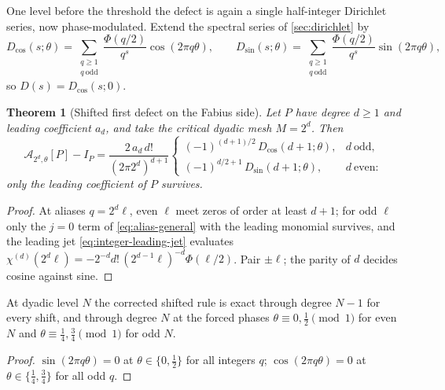 \documentclass[11pt,oneside]{article}
\numberwithin{equation}{section}
\newtheorem{theorem}{Theorem}[section]
\theoremstyle{definition}
\theoremstyle{remark}
\begin{document}
One level before the threshold the defect is again a single
half-integer Dirichlet series, now phase-modulated.  Extend the
spectral series of \cref{sec:dirichlet} by
\begin{equation}
 D_{\cos}(s;\theta)
 =\sum_{\substack{q\ge1\\q\ \mathrm{odd}}}
 \frac{\Phi(q/2)}{q^{s}}\cos(2\pi q\theta),
 \qquad
 D_{\sin}(s;\theta)
 =\sum_{\substack{q\ge1\\q\ \mathrm{odd}}}
 \frac{\Phi(q/2)}{q^{s}}\sin(2\pi q\theta),
 \label{eq:D-phase}
\end{equation}
so $D(s)=D_{\cos}(s;0)$.

\begin{theorem}[Shifted first defect on the Fabius side]
\label{thm:F-first-defect}
Let $P$ have degree $d\ge1$ and leading coefficient $a_d$, and take the
critical dyadic mesh $M=2^{d}$.  Then
\begin{equation}
 \mathcal A_{2^{d},\theta}[P]-I_P
 =\frac{2\,a_d\,d!}{(2\pi 2^{d})^{d+1}}
 \begin{cases}
 (-1)^{(d+1)/2}\,D_{\cos}(d+1;\theta),&d\ \text{odd},\\[0.25em]
 (-1)^{d/2+1}\,D_{\sin}(d+1;\theta),&d\ \text{even}:
 \end{cases}
 \label{eq:F-first-defect}
\end{equation}
only the leading coefficient of $P$ survives.
\end{theorem}

\begin{proof}
At aliases $q=2^{d}\ell$, even $\ell$ meet zeros of order at least
$d+1$; for odd $\ell$ only the $j=0$ term of
\eqref{eq:alias-general} with the leading monomial survives, and the
leading jet \eqref{eq:integer-leading-jet} evaluates
$\chi^{(d)}(2^{d}\ell)=-2^{-d}d!\,(2^{d-1}\ell)^{-d}\Phi(\ell/2)$.
Pair $\pm\ell$; the parity of $d$ decides cosine against sine.
\end{proof}

\begin{corollary}
\label{cor:F-phases}
At dyadic level $N$ the corrected shifted rule is exact through degree
$N-1$ for every shift, and through degree $N$ at the forced phases
$\theta\equiv0,\tfrac12\pmod1$ for even $N$ and
$\theta\equiv\tfrac14,\tfrac34\pmod1$ for odd $N$.
\end{corollary}

\begin{proof}
$\sin(2\pi q\theta)=0$ at $\theta\in\{0,\tfrac12\}$ for all integers
$q$; $\cos(2\pi q\theta)=0$ at $\theta\in\{\tfrac14,\tfrac34\}$ for
all odd $q$.
\end{proof}
\end{document}
